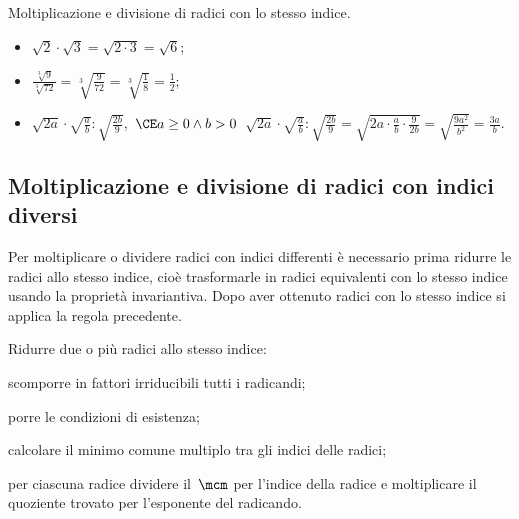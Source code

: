\begin{exrig}
 \begin{esempio}
Moltiplicazione e divisione di radici con lo stesso indice.
\begin{itemize}
\item $\sqrt 2\cdot \sqrt 3=\sqrt{2\cdot 3}=\sqrt 6$;
\item $\frac{\sqrt[3]9}{\sqrt[3]{72}}=\sqrt[3]{\frac 9{72}}=\sqrt[3]{\frac 1 8}=\frac 1 2$;
\item $\sqrt{2a}\cdot \sqrt{\frac a b}:\sqrt{\frac {2b} 9}$,\, $\CE a\ge 0\wedge b>0$\, $\sqrt{2a}\cdot \sqrt{\frac a b}:\sqrt{\frac {2b} 9}=\sqrt{2a\cdot \frac a b\cdot \frac 9{2b}}=\sqrt{\frac{9a^2}{b^2}}=\frac {3a} b$.
\end{itemize}
 \end{esempio}
\end{exrig}

\subsection{Moltiplicazione e divisione di radici con indici diversi}
Per moltiplicare o dividere radici con indici differenti è necessario prima ridurre le radici allo stesso indice, cioè trasformarle in radici equivalenti con lo stesso indice usando la proprietà invariantiva. Dopo aver ottenuto radici con lo stesso indice si applica la regola precedente.

\begin{procedura}
Ridurre due o più radici allo stesso indice:
\begin{enumeratea}
 \item scomporre in fattori irriducibili tutti i radicandi;
 \item porre le condizioni di esistenza;
 \item calcolare il minimo comune multiplo tra gli indici delle radici;
 \item per ciascuna radice dividere il~$\mcm$ per l'indice della radice e moltiplicare il quoziente trovato per l'esponente del radicando.
\end{enumeratea}
\end{procedura}

